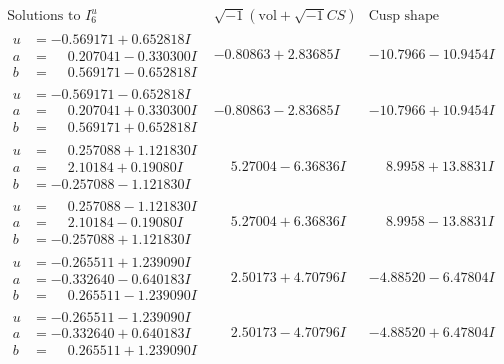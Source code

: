 \documentclass[1p]{elsarticle_modified}
\theoremstyle{definition}
\newcommand{\I}{\sqrt{-1}}
\begin{document}
$$\begin{array}{c|c|c}  
\text{Solutions to }I^u_{6}& \I (\text{vol} + \sqrt{-1}CS) & \text{Cusp shape}\\
 \hline 
\begin{aligned}
u &= -0.569171 + 0.652818 I \\
a &= \phantom{-}0.207041 - 0.330300 I \\
b &= \phantom{-}0.569171 - 0.652818 I\end{aligned}
 & -0.80863 + 2.83685 I & -10.7966 - 10.9454 I \\ \hline\begin{aligned}
u &= -0.569171 - 0.652818 I \\
a &= \phantom{-}0.207041 + 0.330300 I \\
b &= \phantom{-}0.569171 + 0.652818 I\end{aligned}
 & -0.80863 - 2.83685 I & -10.7966 + 10.9454 I \\ \hline\begin{aligned}
u &= \phantom{-}0.257088 + 1.121830 I \\
a &= \phantom{-}2.10184 + 0.19080 I \\
b &= -0.257088 - 1.121830 I\end{aligned}
 & \phantom{-}5.27004 - 6.36836 I & \phantom{-}8.9958 + 13.8831 I \\ \hline\begin{aligned}
u &= \phantom{-}0.257088 - 1.121830 I \\
a &= \phantom{-}2.10184 - 0.19080 I \\
b &= -0.257088 + 1.121830 I\end{aligned}
 & \phantom{-}5.27004 + 6.36836 I & \phantom{-}8.9958 - 13.8831 I \\ \hline\begin{aligned}
u &= -0.265511 + 1.239090 I \\
a &= -0.332640 - 0.640183 I \\
b &= \phantom{-}0.265511 - 1.239090 I\end{aligned}
 & \phantom{-}2.50173 + 4.70796 I & -4.88520 - 6.47804 I \\ \hline\begin{aligned}
u &= -0.265511 - 1.239090 I \\
a &= -0.332640 + 0.640183 I \\
b &= \phantom{-}0.265511 + 1.239090 I\end{aligned}
 & \phantom{-}2.50173 - 4.70796 I & -4.88520 + 6.47804 I \\ \hline\begin{aligned}

\end{aligned}
\end{array}$$
\end{document}
